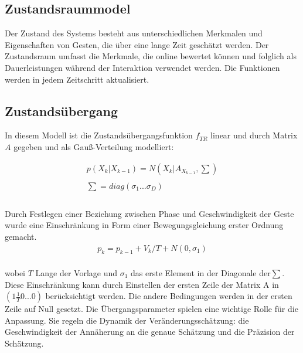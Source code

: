 \documentclass{llncs}
\begin{document}
\subsection{ Zustandsraummodel}
Der Zustand des Systems besteht aus unterschiedlichen Merkmalen und Eigenschaften von Gesten, die über eine lange Zeit geschätzt werden. Der Zustandsraum umfasst die Merkmale, die online bewertet können und folglich als Dauerleistungen während der Interaktion verwendet werden. Die Funktionen werden in jedem Zeitschritt aktualisiert.

\subsection{ Zustandsübergang}

In diesem Modell ist die Zustandsübergangsfunktion $f_{TR}$ linear und durch Matrix $A$ gegeben und als Gauß-Verteilung modelliert: 

\begin{equation}
\left.\begin{array}{l}
 p(X_k|X_{k-1}) =  N(X_k|A_{X_{k-1}},\sum )\\\\ 
		\sum   = diag(\sigma_1...\sigma_D)             \\
		\\
\end{array}\right.		
\end{equation}

Durch Festlegen einer Beziehung zwischen Phase und Geschwindigkeit der Geste wurde eine Einschränkung in Form einer Bewegungsgleichung erster Ordnung gemacht. 
\begin{equation}
\left.\begin{array}{l}
p_k=p_{k-1} + V_k/T + N(0,\sigma_1)	
\end{array}\right.		
\end{equation}					
\\
wobei $T$ Lange der Vorlage und $\sigma_1$ das erste Element in der Diagonale der$ \sum$. Diese Einschränkung kann durch Einstellen der ersten Zeile der Matrix A in $ (1  \frac{1}{T}  0 ...0) $ berücksichtigt werden. Die andere Bedingungen werden in der ersten Zeile auf Null gesetzt.
Die Übergangsparameter spielen eine wichtige Rolle für die Anpassung. Sie regeln die Dynamik  der Veränderungsschätzung: die Geschwindigkeit der Annäherung an die genaue Schätzung und die Präzision der Schätzung.
\end{document}
